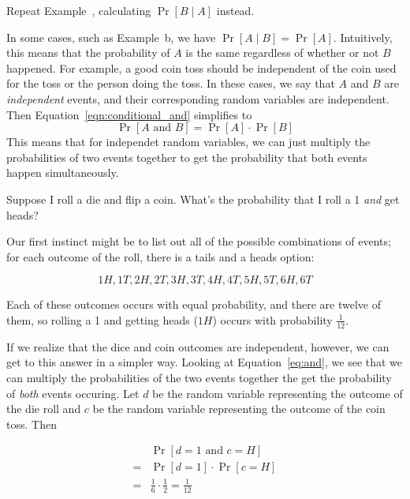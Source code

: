 \begin{exercise}
    Repeat Example~, calculating $\Pr[B \mid A]$ instead.
\end{exercise}

In some cases, such as Example~b, we have $\Pr[A \mid 
B]=\Pr[A]$. Intuitively, this means 
that the probability of $A$ is the same regardless of whether or not $B$
happened. For example, a good coin toss should be independent of the coin 
used for the toss or the person doing the toss.
In these cases, we say that $A$ and $B$ are \emph{independent} events, and 
their corresponding random variables are independent. Then Equation~\ref{eqn:conditional_and}
simplifies to 
\begin{equation}\label{eq:and}
   \Pr[A \text{ and } B] = \Pr[A] \cdot \Pr[B]
\end{equation}
This means that for independet random variables, we can just multiply the probabilities 
of two events together to get the probability that both events happen simultaneously.

\begin{example}
    Suppose I roll a die and flip a coin. What's the probability that I roll a 1 
    \emph{and} get heads?

    Our first instinct might be to list out all of the possible 
    combinations of events; for each outcome of the roll, there is a tails and a 
    heads option:

    \[
        1H, 1T, 2H, 2T, 3H, 3T, 4H, 4T, 5H, 5T, 6H, 6T
    \]

    Each of these outcomes occurs with equal probability, and there 
    are twelve of them, so rolling a 1 and getting heads ($1H$) occurs 
    with probability $\frac{1}{12}$.

    If we realize that the dice and coin outcomes are independent, however,
    we can get to this answer in a simpler way. Looking at Equation~\ref{eq:and}, 
    we see that we can multiply the probabilities of the two events together
    the get the probability of \emph{both} events occuring. Let 
    $d$ be the random variable representing the outcome of the die roll and $c$ 
    be the random variable representing the outcome of the coin toss. Then 

    \begin{align*}
        &\Pr[d=1 \text{ and } c=H]\\
        =& \Pr[d=1] \cdot \Pr[c=H]\\
        =& \frac{1}{6} \cdot \frac{1}{2} = \frac{1}{12}
    \end{align*}
\end{example}

